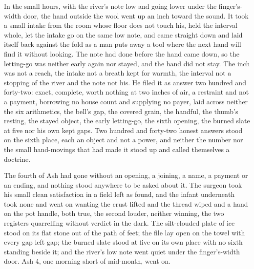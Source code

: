 In the small hours, with the river's note low and going lower under the finger's-width door, the hand outside the wool went up an inch toward the sound. It took a small intake from the room whose floor does not touch his, held the interval whole, let the intake go on the same low note, and came straight down and laid itself back against the fold as a man puts away a tool where the next hand will find it without looking. The note had done before the hand came down, so the letting-go was neither early again nor stayed, and the hand did not stay. The inch was not a reach, the intake not a breath kept for warmth, the interval not a stopping of the river and the note not his. He filed it as answer two hundred and forty-two: exact, complete, worth nothing at two inches of air, a restraint and not a payment, borrowing no house count and supplying no payer, laid across neither the six arithmetics, the bell's gap, the covered grain, the handful, the thumb's resting, the stayed object, the early letting-go, the sixth opening, the burned slate at five nor his own kept gaps. Two hundred and forty-two honest answers stood on the sixth place, each an object and not a power, and neither the number nor the small hand-movings that had made it stood up and called themselves a doctrine.

The fourth of Ash had gone without an opening, a joining, a name, a payment or an ending, and nothing stood anywhere to be asked about it. The surgeon took his small clean satisfaction in a field left as found, and the infant underneath took none and went on wanting the crust lifted and the thread wiped and a hand on the pot handle, both true, the second louder, neither winning, the two registers quarrelling without verdict in the dark. The silt-clouded plate of ice stood on its flat stone out of the path of feet; the file lay open on the towel with every gap left gap; the burned slate stood at five on its own place with no sixth standing beside it; and the river's low note went quiet under the finger's-width door. Ash 4, one morning short of mid-month, went on.
